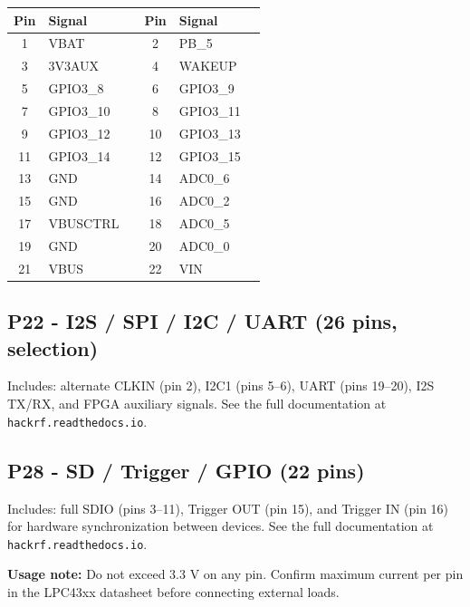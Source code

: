 \documentclass[11pt]{article}
\begin{document}
\begin{table}[h]
    \centering
    \small
    \begin{tabular}{clc|clc}
        \toprule
        \textbf{Pin} & \textbf{Signal} & & \textbf{Pin} & \textbf{Signal} & \\
        \midrule
        1  & VBAT       & & 2  & PB\_5        & \\
        3  & 3V3AUX     & & 4  & WAKEUP       & \\
        5  & GPIO3\_8   & & 6  & GPIO3\_9     & \\
        7  & GPIO3\_10  & & 8  & GPIO3\_11    & \\
        9  & GPIO3\_12  & & 10 & GPIO3\_13    & \\
        11 & GPIO3\_14  & & 12 & GPIO3\_15    & \\
        13 & GND        & & 14 & ADC0\_6      & \\
        15 & GND        & & 16 & ADC0\_2      & \\
        17 & VBUSCTRL   & & 18 & ADC0\_5      & \\
        19 & GND        & & 20 & ADC0\_0      & \\
        21 & VBUS       & & 22 & VIN          & \\
        \bottomrule
    \end{tabular}
\end{table}

\subsection*{P22 - I2S / SPI / I2C / UART (26 pins, selection)}

Includes: alternate CLKIN (pin 2), I2C1 (pins 5--6), UART (pins 19--20), I2S TX/RX, and FPGA auxiliary signals. See the full documentation at \texttt{hackrf.readthedocs.io}.

\subsection*{P28 - SD / Trigger / GPIO (22 pins)}

Includes: full SDIO (pins 3--11), Trigger OUT (pin 15), and Trigger IN (pin 16) for hardware synchronization between devices. See the full documentation at \texttt{hackrf.readthedocs.io}.

\textbf{Usage note:} Do not exceed 3.3 V on any pin. Confirm maximum current per pin in the LPC43xx datasheet before connecting external loads.
\end{document}
